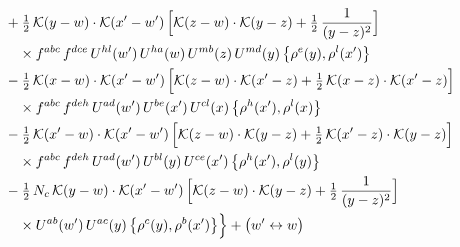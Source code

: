 \documentclass[10pt]{article}
\numberwithin{equation}{section}
\newcommand{\KK}{\mathcal K}
\begin{document}
\begin{align}
&\quad +\tfrac12\,\KK(y-w)\cdot\KK(x'-w')\,\Big[\KK(z-w)\cdot\KK(y-z)+\tfrac12\,\frac{1}{(y-z)^2}\Big]\notag\\
&\qquad\times f^{abc}\,f^{dce}\,U^{hl}(w')\,U^{ha}(w)\,U^{mb}(z)\,U^{md}(y)\,\big\{\rho^{e}(y),\rho^{l}(x')\big\}\notag\\
&\quad -\tfrac12\,\KK(x-w)\cdot\KK(x'-w')\,\Big[\KK(z-w)\cdot\KK(x'-z)+\tfrac12\,\KK(x-z)\cdot\KK(x'-z)\Big]\notag\\
&\qquad\times f^{abc}\,f^{deh}\,U^{ad}(w')\,U^{be}(x')\,U^{cl}(x)\,\big\{\rho^{h}(x'),\rho^{l}(x)\big\}\notag\\
&\quad -\tfrac12\,\KK(x'-w)\cdot\KK(x'-w')\,\Big[\KK(z-w)\cdot\KK(y-z)+\tfrac12\,\KK(x'-z)\cdot\KK(y-z)\Big]\notag\\
&\qquad\times f^{abc}\,f^{deh}\,U^{ad}(w')\,U^{bl}(y)\,U^{ce}(x')\,\big\{\rho^{h}(x'),\rho^{l}(y)\big\}\notag\\
&\quad -\tfrac12\,N_{c}\,\KK(y-w)\cdot\KK(x'-w')\,\Big[\KK(z-w)\cdot\KK(y-z)+\tfrac12\,\frac{1}{(y-z)^2}\Big]\notag\\
&\qquad\times U^{ab}(w')\,U^{ac}(y)\,\big\{\rho^{c}(y),\rho^{b}(x')\big\}\Big\}+\big(w'\leftrightarrow w\big)\label{R:eq:sum-GI.IV}
\end{align}
\end{document}
